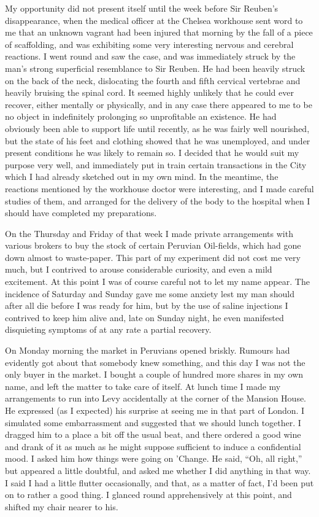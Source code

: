 My opportunity did not present itself until the week before Sir Reuben’s disappearance, when the medical officer at the Chelsea workhouse sent word to me that an unknown vagrant had been injured that morning by the fall of a piece of scaffolding, and was exhibiting some very interesting nervous and cerebral reactions. I went round and saw the case, and was immediately struck by the man’s strong superficial resemblance to Sir Reuben. He had been heavily struck on the back of the neck, dislocating the fourth and fifth cervical vertebrae and heavily bruising the spinal cord. It seemed highly unlikely that he could ever recover, either mentally or physically, and in any case there appeared to me to be no object in indefinitely prolonging so unprofitable an existence. He had obviously been able to support life until recently, as he was fairly well nourished, but the state of his feet and clothing showed that he was unemployed, and under present conditions he was likely to remain so. I decided that he would suit my purpose very well, and immediately put in train certain transactions in the City which I had already sketched out in my own mind. In the meantime, the reactions mentioned by the workhouse doctor were interesting, and I made careful studies of them, and arranged for the delivery of the body to the hospital when I should have completed my preparations.

On the Thursday and Friday of that week I made private arrangements with various brokers to buy the stock of certain Peruvian Oil-fields, which had gone down almost to waste-paper. This part of my experiment did not cost me very much, but I contrived to arouse considerable curiosity, and even a mild excitement. At this point I was of course careful not to let my name appear. The incidence of Saturday and Sunday gave me some anxiety lest my man should after all die before I was ready for him, but by the use of saline injections I contrived to keep him alive and, late on Sunday night, he even manifested disquieting symptoms of at any rate a partial recovery.

On Monday morning the market in Peruvians opened briskly. Rumours had evidently got about that somebody knew something, and this day I was not the only buyer in the market. I bought a couple of hundred more shares in my own name, and left the matter to take care of itself. At lunch time I made my arrangements to run into Levy accidentally at the corner of the Mansion House. He expressed (as I expected) his surprise at seeing me in that part of London. I simulated some embarrassment and suggested that we should lunch together. I dragged him to a place a bit off the usual beat, and there ordered a good wine and drank of it as much as he might suppose sufficient to induce a confidential mood. I asked him how things were going on ’Change. He said, \enquote{Oh, all right,} but appeared a little doubtful, and asked me whether I did anything in that way. I said I had a little flutter occasionally, and that, as a matter of fact, I’d been put on to rather a good thing. I glanced round apprehensively at this point, and shifted my chair nearer to his.

